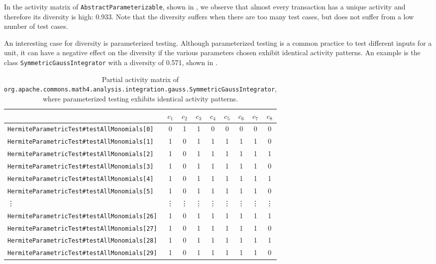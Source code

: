 \documentclass[twoside,a4paper,11pt]{memoir}
\begin{document}
In the activity matrix of \texttt{Abstract\-Parameterizable}, shown in , we observe that almost every transaction has a unique activity and therefore its diversity is high: 0.933.
Note that the diversity suffers when there are too many test cases, but does not suffer from a low number of test cases.

An interesting case for diversity is parameterized testing.
Although parameterized testing is a common practice to test different inputs for a unit, it can have a negative effect on the diversity if the various parameters chosen exhibit identical activity patterns.
An example is the class \texttt{Symmetric\-Gauss\-Integrator} with a diversity of 0.571, shown in .


\begin{table}[]
    \scriptsize
    \centering
    \caption{Partial activity matrix of \texttt{org.\-apache.\-commons.\-math4.\-analysis.\-integration.\-gauss.\-SymmetricGaussIntegrator}, where parameterized testing exhibits identical activity patterns.}%
    \label{tab:hermite}
    \begin{adjustbox}{center}
    \begin{tabular}{l|cccccccc}
     & \(c_1 \) & \(c_2 \) & \(c_3 \) & \(c_4 \) & \(c_5 \) & \(c_6 \) & \(c_7 \) & \(c_8 \) \\ \hline
    \texttt{HermiteParametricTest\#testAllMonomials[0]} & 0 & 1 & 1 & 0 & 0 & 0 & 0 & 0 \\
    \texttt{HermiteParametricTest\#testAllMonomials[1]} & 1 & 0 & 1 & 1 & 1 & 1 & 1 & 0 \\
    \texttt{HermiteParametricTest\#testAllMonomials[2]} & 1 & 0 & 1 & 1 & 1 & 1 & 1 & 1 \\
    \texttt{HermiteParametricTest\#testAllMonomials[3]} & 1 & 0 & 1 & 1 & 1 & 1 & 1 & 0 \\
    \texttt{HermiteParametricTest\#testAllMonomials[4]} & 1 & 0 & 1 & 1 & 1 & 1 & 1 & 1 \\
    \texttt{HermiteParametricTest\#testAllMonomials[5]} & 1 & 0 & 1 & 1 & 1 & 1 & 1 & 0 \\
    \vdots & \vdots & \vdots & \vdots & \vdots & \vdots & \vdots & \vdots & \vdots \\
    \texttt{HermiteParametricTest\#testAllMonomials[26]} & 1 & 0 & 1 & 1 & 1 & 1 & 1 & 1 \\
    \texttt{HermiteParametricTest\#testAllMonomials[27]} & 1 & 0 & 1 & 1 & 1 & 1 & 1 & 0 \\
    \texttt{HermiteParametricTest\#testAllMonomials[28]} & 1 & 0 & 1 & 1 & 1 & 1 & 1 & 1 \\
    \texttt{HermiteParametricTest\#testAllMonomials[29]} & 1 & 0 & 1 & 1 & 1 & 1 & 1 & 0
    \end{tabular}
    \end{adjustbox}
\end{table}
\end{document}
